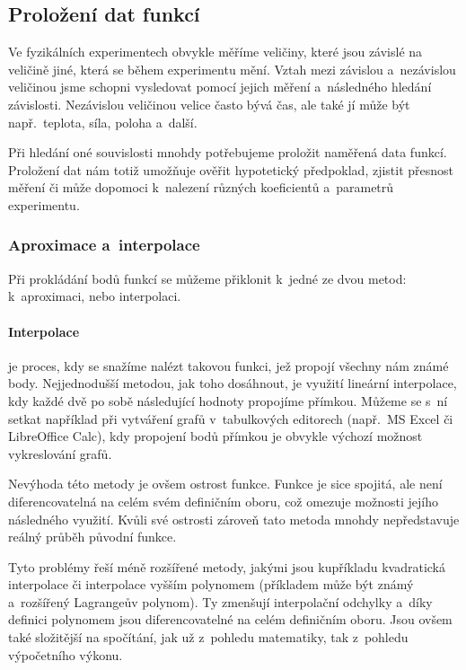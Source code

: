 \subsection{Proložení dat funkcí}
Ve fyzikálních experimentech obvykle měříme veličiny, které jsou závislé na
veličině jiné, která se během experimentu mění. Vztah mezi závislou
a~nezávislou veličinou jsme schopni vysledovat pomocí jejich měření a~následného
hledání závislosti.  Nezávislou veličinou velice často bývá čas, ale také jí
může být např.~teplota, síla, poloha a~další.~\cite{praktikum}
 
Při hledání oné souvislosti mnohdy potřebujeme proložit naměřená data funkcí.
Proložení dat nám totiž umožňuje ověřit hypotetický předpoklad, zjistit přesnost
měření či může dopomoci k~nalezení různých koeficientů a~parametrů experimentu.

\subsubsection{Aproximace a~interpolace}
Při prokládání bodů funkcí se můžeme přiklonit k~jedné ze dvou metod:
k~aproximaci, nebo interpolaci.

\paragraph{Interpolace} je proces, kdy se snažíme nalézt takovou funkci, jež
propojí všechny nám známé body. Nejjednodušší metodou, jak toho dosáhnout, je
využití lineární interpolace, kdy každé dvě po sobě následující hodnoty
propojíme přímkou. Můžeme se s~ní setkat například při vytváření grafů
v~tabulkových editorech (např.~MS Excel či LibreOffice Calc), kdy propojení
bodů přímkou je obvykle výchozí možnost vykreslování grafů. 

Nevýhoda této metody je ovšem ostrost funkce. Funkce je sice spojitá, ale není
diferencovatelná na celém svém definičním oboru, což omezuje možnosti jejího
následného využití. Kvůli své ostrosti zároveň tato metoda mnohdy nepředstavuje
reálný průběh původní funkce.~\cite{segeth}

Tyto problémy řeší méně rozšířené metody, jakými jsou kupříkladu kvadratická
interpolace či interpolace vyšším polynomem (příkladem může být známý
a~rozšířený Lagrangeův polynom). Ty zmenšují interpolační odchylky a~díky
definici polynomem jsou diferencovatelné na celém definičním oboru. Jsou ovšem
také složitější na spočítání, jak už z~pohledu matematiky, tak z~pohledu
výpočetního výkonu.

